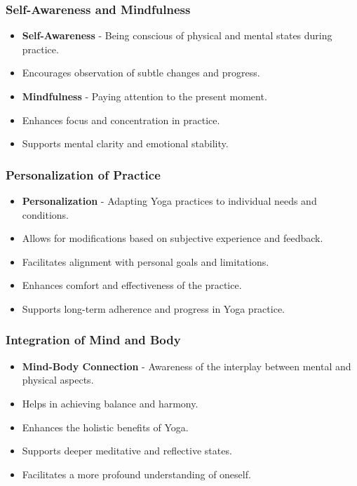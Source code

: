 \begin{frame}[fragile]\frametitle{Self-Awareness and Mindfulness}

      \begin{itemize}
		\item \textbf{Self-Awareness} - Being conscious of physical and mental states during practice.
		\item Encourages observation of subtle changes and progress.
		\item \textbf{Mindfulness} - Paying attention to the present moment.
		\item Enhances focus and concentration in practice.
		\item Supports mental clarity and emotional stability.
	  \end{itemize}

\end{frame}

\begin{frame}[fragile]\frametitle{Personalization of Practice}

      \begin{itemize}
		\item \textbf{Personalization} - Adapting Yoga practices to individual needs and conditions.
		\item Allows for modifications based on subjective experience and feedback.
		\item Facilitates alignment with personal goals and limitations.
		\item Enhances comfort and effectiveness of the practice.
		\item Supports long-term adherence and progress in Yoga practice.
	  \end{itemize}

\end{frame}

\begin{frame}[fragile]\frametitle{Integration of Mind and Body}

      \begin{itemize}
		\item \textbf{Mind-Body Connection} - Awareness of the interplay between mental and physical aspects.
		\item Helps in achieving balance and harmony.
		\item Enhances the holistic benefits of Yoga.
		\item Supports deeper meditative and reflective states.
		\item Facilitates a more profound understanding of oneself.
	  \end{itemize}

\end{frame}

